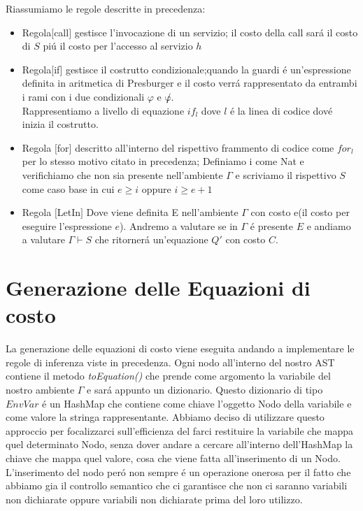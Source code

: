 \documentclass[../../main.tex]{subfiles}
\begin{document}
Riassumiamo le regole descritte in precedenza:\\
\begin{itemize}
    \item Regola$[$call$]$ gestisce l'invocazione di un servizio; il costo della call sará il costo di $S$ piú il costo per l'accesso al servizio $h$ 
    \item Regola$[$if$]$ gestisce il costrutto condizionale;quando la guardi é un'espressione definita in aritmetica di Presburger e il costo verrá rappresentato da entrambi i rami con i due condizionali $\varphi $ e $\not \varphi$.\\Rappresentiamo a livello di equazione $if_l$ dove $l$ é la linea di codice dové inizia il costrutto.
    \item Regola $[$for$]$ descritto all'interno del rispettivo frammento di codice come $for_l$ per lo stesso motivo citato in precedenza; Definiamo i come Nat e verifichiamo che non sia presente nell'ambiente $\varGamma$ e scriviamo il rispettivo $S$ come caso base in cui $e \geq i$ oppure $i \geq e + 1$
    \item Regola $[$LetIn$]$ Dove viene definita E nell'ambiente $\varGamma$ con costo e(il costo per eseguire l'espressione $e$). Andremo a valutare se in $\varGamma$ é presente $E$ e andiamo a valutare $\varGamma \vdash S$ che ritornerá un'equazione $Q'$ con costo $C$.
\end{itemize}
\section{Generazione delle Equazioni di costo}
La generazione delle equazioni di costo viene eseguita andando a implementare le regole di inferenza viste in precedenza.
Ogni nodo all'interno del nostro AST contiene il metodo \textit{toEquation()} che prende come argomento la variabile del nostro ambiente $\varGamma$ e sará appunto un dizionario.
Questo dizionario di tipo $EnvVar$ é un HashMap che contiene come chiave l'oggetto Nodo della variabile e come valore la stringa rappresentante.
Abbiamo deciso di utilizzare questo approccio per focalizzarci sull'efficienza del farci restituire la variabile che mappa quel determinato Nodo, senza dover andare a cercare all'interno dell'HashMap la chiave che mappa quel valore, cosa che viene fatta all'inserimento di un Nodo.
L'inserimento del nodo peró non sempre é un operazione onerosa per il fatto che abbiamo gia il controllo semantico che ci garantisce che non ci saranno variabili non dichiarate oppure variabili non dichiarate prima del loro utilizzo.
\end{document}
